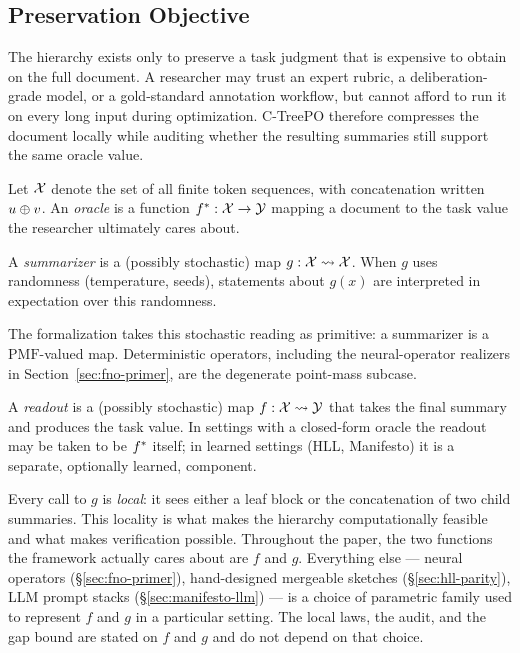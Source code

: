 \subsection{Preservation Objective}

The hierarchy exists only to preserve a task judgment that is expensive to obtain on the full document. A researcher may trust an expert rubric, a deliberation-grade model, or a gold-standard annotation workflow, but cannot afford to run it on every long input during optimization. C-TreePO therefore compresses the document locally while auditing whether the resulting summaries still support the same oracle value.

\begin{definition}[Oracle]\label{def:oracle}
Let $\mathcal{X}$ denote the set of all finite token sequences, with concatenation written $u \oplus v$. An \emph{oracle} is a function $f^\ast: \mathcal{X} \to \mathcal{Y}$ mapping a document to the task value the researcher ultimately cares about.
\end{definition}

\begin{definition}[Summarizer]\label{def:summarizer}
A \emph{summarizer} is a (possibly stochastic) map $g: \mathcal{X} \rightsquigarrow \mathcal{X}$. When $g$ uses randomness (temperature, seeds), statements about $g(x)$ are interpreted in expectation over this randomness.
\end{definition}

The formalization takes this stochastic reading as primitive: a summarizer is a $\mathrm{PMF}$-valued map. Deterministic operators, including the neural-operator realizers in Section~\ref{sec:fno-primer}, are the degenerate point-mass subcase.

\begin{definition}[Readout]\label{def:readout}
A \emph{readout} is a (possibly stochastic) map $f : \mathcal{X} \rightsquigarrow \mathcal{Y}$ that takes the final summary and produces the task value. In settings with a closed-form oracle the readout may be taken to be $f^\ast$ itself; in learned settings (HLL, Manifesto) it is a separate, optionally learned, component.
\end{definition}

Every call to $g$ is \emph{local}: it sees either a leaf block or the concatenation of two child summaries. This locality is what makes the hierarchy computationally feasible and what makes verification possible. Throughout the paper, the two functions the framework actually cares about are $f$ and $g$. Everything else --- neural operators (\S\ref{sec:fno-primer}), hand-designed mergeable sketches (\S\ref{sec:hll-parity}), LLM prompt stacks (\S\ref{sec:manifesto-llm}) --- is a choice of parametric family used to represent $f$ and $g$ in a particular setting. The local laws, the audit, and the gap bound are stated on $f$ and $g$ and do not depend on that choice.

